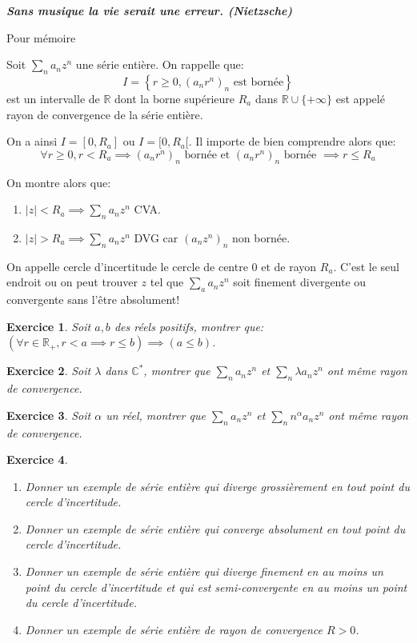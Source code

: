 \documentclass[12pt,a4paper]{article}
\newcommand{\R}{\mathbb{R}}
\newcommand{\C}{\mathbb{C}}
\newcommand{\abs}[1]{\left\lvert#1\right\rvert}
\theoremstyle{break}
\theoremstyle{break}
\newtheorem{Exo}{Exercice}
\begin{document}
\emph{\textbf{
	Sans musique la vie serait une erreur. (Nietzsche)
}}

\begin{bclogo}[couleur = green!30, arrondi = 0.1, logo = \bccoeur, barre = zigzag]{Pour mémoire}

Soit $\sum_n a_n z^n$ une série entière. On rappelle que:
$$I=\left\{r\geqslant 0,(a_nr^n)_n\text{ est bornée}\right\}$$ est un intervalle de $\R$ dont la borne supérieure $R_a$ dans $\R\cup\{+\infty\}$ est appelé rayon de convergence de la série entière.

On a ainsi $I=[0,R_a]$ ou $I=[0,R_a[$. Il importe de bien comprendre alors que:
$$\forall r \geqslant 0,r<R_a\implies (a_nr^n)_n\text{ bornée et }(a_nr^n)_n\text{ bornée }\implies r\leqslant R_a$$

On montre alors que:
\begin{enumerate}
	\item
	$\abs{z}<R_a\implies \sum_n a_n z^n$ CVA.
	\item
	$\abs{z}>R_a\implies \sum_n a_n z^n$ DVG car $(a_nz^n)_n$ non bornée.
\end{enumerate}
On appelle cercle d'incertitude le cercle de centre $0$ et de rayon $R_a$. C'est le seul endroit ou on peut trouver $z$ tel que $\sum_a a_n z^n$ soit finement divergente ou convergente sans l'être absolument!
\end{bclogo}
\vspace*{1cm}


\begin{Exo}
	Soit $a,b$ des réels positifs, montrer que:
	$\left(\forall r\in \R_+,r<a\implies r\leqslant b\right)\implies \left(a\leqslant b\right)$.
\end{Exo}

\begin{Exo}
	Soit $\lambda$ dans $\C^*$, montrer que $\sum_n a_nz^n$ et $\sum_n \lambda a_n z^n$ ont même rayon de convergence.
\end{Exo}
\newpage
\begin{Exo}
	Soit $\alpha$ un réel, montrer que $\sum_n a_n z^n$ et $\sum_n n^{\alpha}a_n z^n$ ont même rayon de convergence.
\end{Exo}

\begin{Exo}\ 
	\begin{enumerate}
		\item
		Donner un exemple de série entière qui diverge grossièrement en tout point du cercle d'incertitude.
		\item
		Donner un exemple de série entière qui converge absolument en tout point du cercle d'incertitude.
		\item
		Donner un exemple de série entière qui diverge finement en au moins un point du cercle d'incertitude et qui est semi-convergente en au moins un point du cercle d'incertitude.
		\item Donner un exemple de série entière de rayon de convergence $R>0$.
	\end{enumerate}
	
\end{Exo}
\end{document}
